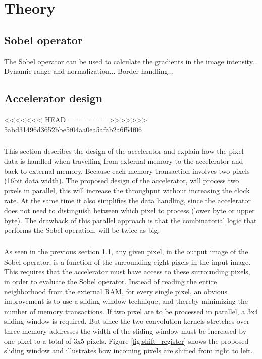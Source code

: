 \chapter{Theory}

\section{Sobel operator}
\label{sec:Sobel}
The Sobel operator can be used to calculate the gradients in the image intensity...
Dynamic range and normalization...
Border handling...

\section{Accelerator design} 
<<<<<<< HEAD
=======
\label{sec:AccDesign}
>>>>>>> 5abd31496d3652bbe5f04aa0ea5afab2a6f54f06
\paragraph*{}
This section describes the design of the accelerator and explain how the pixel data is handled when travelling from external memory to the accelerator and back to external memory. 
Because each memory transaction involves two pixels (16bit data width). The proposed design of the accelerator, will process two pixels in parallel, this will increase the throughput without increasing the clock rate. At the same time it also simplifies the data handling, since the accelerator does not need to distinguish between which pixel to process (lower byte or upper byte). The drawback of this parallel approach is that the combinatorial logic that performs the Sobel operation, will be twice as big.

\paragraph*{}
As seen in the previous section \ref{sec:Sobel}, any given pixel, in the output image of the Sobel operator, is a function of the surrounding eight pixels in the input image. This requires that the accelerator must have access to these surrounding pixels, in order to evaluate the Sobel operator. Instead of reading the entire neighborhood from the external RAM, for every single pixel, an obvious improvement is to use a sliding window technique, and thereby minimizing the number of memory transactions. If two pixel are to be processed in parallel, a 3x4 sliding window is required. But since the two convolution kernels stretches over three memory addresses the width of the sliding window must be increased by one pixel to a total of 3x5 pixels.
Figure \ref{fig:shift_register} shows the proposed sliding window and illustrates how incoming pixels are shifted from right to left.

